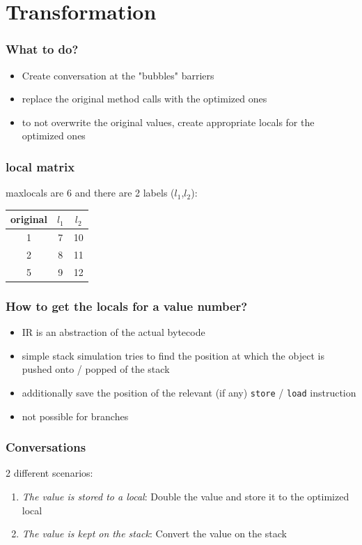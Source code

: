 \documentclass{beamer}
\begin{document}
\section{Transformation}

\frame{\sectionpage}

\begin{frame}
	\frametitle{What to do?}
	\begin{itemize}
    \item Create conversation at the "bubbles" barriers
    \item replace the original method calls with the optimized ones
    \item to not overwrite the original values, create appropriate locals for the optimized ones
	\end{itemize}
\end{frame}

\begin{frame}
  \frametitle{local matrix}
  
  maxlocals are 6 and there are 2 labels ($l_1$,$l_2$):
  
  \begin{center}
    \begin{tabular}{c || c | c}
      original & $l_1$ & $l_2$ \\
      \hline 
      1 & 7 & 10 \\
      \hline
      2 & 8 & 11 \\
      \hline
      5 & 9 & 12 \\
    \end{tabular}
  \end{center}    
\end{frame}

\begin{frame}
	\frametitle{How to get the locals for a value number?}
	\begin{itemize}
    \item IR is an abstraction of the actual bytecode
    \item simple stack simulation tries to find the position at which the object is pushed onto / popped of the stack
 	  \item additionally save the position of the relevant (if any) \texttt{store} / \texttt{load} instruction 
    \item not possible for branches
	\end{itemize}
\end{frame}

\begin{frame}
  \frametitle{Conversations}  
  2 different scenarios:
  \begin{enumerate}
    \item \textit{The value is stored to a local}: Double the value and store it to the optimized local  
    \item \textit{The value is kept on the stack}: Convert the value on the stack
  \end{enumerate}
\end{frame}
\end{document}
